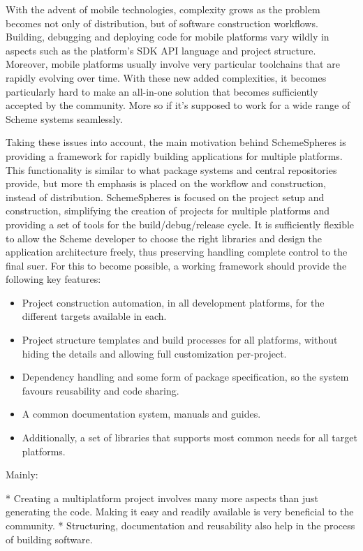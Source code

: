 \documentclass{acm_proc_article-sp}
\begin{document}
With the advent of mobile technologies, complexity grows as the problem becomes not only of distribution, but of software construction workflows. Building, debugging and deploying code for mobile platforms vary wildly in aspects such as the platform's SDK API language and project structure. Moreover, mobile platforms usually involve very particular toolchains that are rapidly evolving over time. With these new added complexities, it becomes particularly hard to make an all-in-one solution that becomes sufficiently accepted by the community. More so if it's supposed to work for a wide range of Scheme systems seamlessly.

Taking these issues into account, the main motivation behind SchemeSpheres is providing a framework for rapidly building applications for multiple platforms. This functionality is similar to what package systems and central repositories provide, but more th emphasis is placed on the workflow and construction, instead of distribution. SchemeSpheres is focused on the project setup and construction, simplifying the creation of projects for multiple platforms and providing a set of tools for the build/debug/release cycle. It is sufficiently flexible to allow the Scheme developer to choose the right libraries and design the application architecture freely, thus preserving handling complete control to the final suer. For this to become possible, a working framework should provide the following key features:

\begin{itemize}
  \item Project construction automation, in all development platforms, for the different targets available in each.
  \item Project structure templates and build processes for all platforms, without hiding the details and allowing full customization per-project.
  \item Dependency handling and some form of package specification, so the system favours reusability and code sharing.
  \item A common documentation system, manuals and guides.
  \item Additionally, a set of libraries that supports most common needs for all target platforms.
\end{itemize}


Mainly:

* Creating a multiplatform project involves many more aspects than just generating the code. Making it easy and readily available is very beneficial to the community.
* Structuring, documentation and reusability also help in the process of building software.
\end{document}
